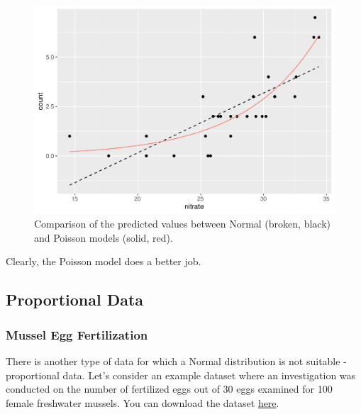 \documentclass[
]{article}
\begin{document}
\begin{figure}

{\centering \includegraphics{biostats_files/figure-latex/normal-pois-1} 

}

\caption{Comparison of the predicted values between Normal (broken, black) and Poisson models (solid, red).}\label{fig:normal-pois}
\end{figure}

Clearly, the Poisson model does a better job.

\hypertarget{proportional-data}{%
\subsection{Proportional Data}\label{proportional-data}}

\hypertarget{mussel-egg-fertilization}{%
\subsubsection{Mussel Egg Fertilization}\label{mussel-egg-fertilization}}

There is another type of data for which a Normal distribution is not suitable - proportional data. Let's consider an example dataset where an investigation was conducted on the number of fertilized eggs out of 30 eggs examined for 100 female freshwater mussels. You can download the dataset \href{https://github.com/aterui/biostats/blob/master/data_raw/data_mussel.csv}{here}.
\end{document}
